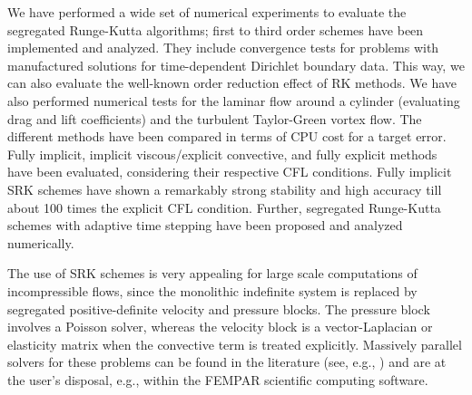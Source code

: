 We have performed a wide set of numerical experiments to evaluate the segregated Runge-Kutta algorithms; first to third order schemes have been implemented and analyzed. They include convergence tests for problems with  manufactured solutions for time-dependent Dirichlet boundary data. This way, we can also evaluate the well-known order reduction effect of RK methods. We have also performed numerical tests for the laminar flow around a cylinder (evaluating drag and lift coefficients) and the turbulent Taylor-Green vortex flow. The different methods have been compared in terms of CPU cost for a target error. Fully implicit, implicit viscous/explicit convective, and fully explicit methods have been evaluated, considering their respective CFL conditions. Fully implicit SRK schemes have shown a remarkably strong stability and high accuracy till about 100 times the explicit CFL condition. Further, segregated Runge-Kutta schemes with adaptive time stepping have been proposed and analyzed numerically. 

The use of SRK schemes is very appealing for large scale computations of incompressible flows, since the monolithic indefinite system is replaced by segregated positive-definite velocity and pressure blocks. The pressure block involves a Poisson solver, whereas the velocity block is a vector-Laplacian or elasticity matrix when the convective term is treated explicitly. Massively parallel solvers for these problems can be found in the literature (see, e.g., \cite{art003}) and are at the user's disposal, e.g., within the FEMPAR scientific computing software.